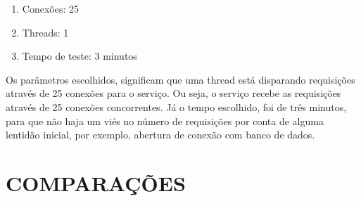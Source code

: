 \begin{enumerate}
  \item Conexões: 25
  \item Threads: 1
  \item Tempo de teste: 3 minutos
\end{enumerate}

Os parâmetros escolhidos, significam que uma thread está disparando requisições através 
de 25 conexões para o serviço. Ou seja, o serviço recebe as requisições através de 25 conexões
concorrentes. Já o tempo escolhido, foi de três minutos, para que não haja um viés no número
de requisições por conta de alguma lentidão inicial, por exemplo, abertura de conexão com 
banco de dados.

\section{COMPARAÇÕES}
